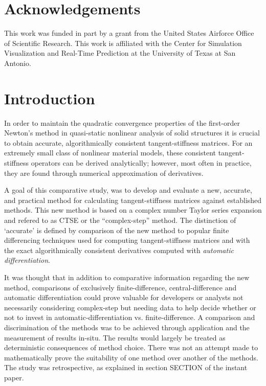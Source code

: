 \documentclass[preprint,12pt]{elsarticle}
\begin{document}

\section{Acknowledgements}
This work was funded in part by a grant from the United States Airforce Office of Scientific
Research. This work is affiliated with the Center for Simulation Visualization and Real-Time
Prediction at the University of Texas at San Antonio.


\section{Introduction}
\label{sec:intro} 

In order to maintain the quadratic convergence properties of the first-order Newton's method in
quasi-static nonlinear analysis of solid structures it is crucial to obtain accurate,
algorithmically consistent tangent-stiffness matrices. For an extremely small class of nonlinear
material models, these consistent tangent-stiffness operators can be derived analytically; however,
most often in practice, they are found through numerical approximation of derivatives. 

A goal of this comparative study, was to develop and evaluate a new, accurate, and practical method
for calculating tangent-stiffness matrices against established methods.  This new method is based on
a complex number Taylor series expansion and refered to as CTSE or the ``complex-step'' method.  The
distinction of `accurate' is defined by comparison of the new method to popular finite differencing
techniques used for computing tangent-stiffness matrices and with the exact algorithmically
consistent derivatives computed with \emph{automatic differentiation}.

It was thought that in addition to comparative information regarding the new method, comparisons of
exclusively finite-difference, central-difference and automatic differentiation could prove valuable
for developers or analysts not necessarily considering complex-step but needing data to help decide
whether or not to invest in automatic-differentiation vs. finite-difference.  A comparison and
discrimination of the methods was to be achieved through application and the measurement of results
in-situ. The results would largely be treated as deterministic consequences of method choice. There
was not an attempt made to mathematically prove the suitability of one method over another of the
methods. The study was retrospective, as explained in section {SECTION} of the instant paper. 
\end{document}
